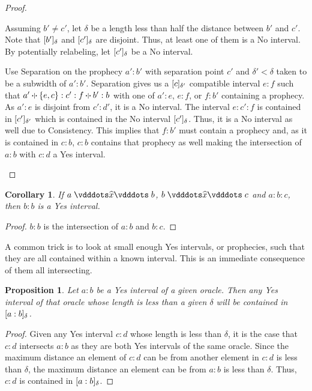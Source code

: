 \documentclass[12pt]{article}
\newtheorem{corollary}{Corollary}[section]
\newtheorem{proposition}{Proposition}[section]
\begin{document}
\begin{proof}
\begin{enumerate}
        Assuming $b' \neq c'$, let $\delta$ be a length less than half the distance between $b'$ and $c'$. Note that $\halo{b'}$ and $\halo{c'}$ are disjoint. Thus, at least one of them is a No interval. By potentially relabeling, let $\halo{c'}$ be a No interval. 

        Use Separation on the prophecy $a':b'$ with separation point $c'$ and $\delta' < \delta$ taken to be a subwidth of $a':b'$. Separation gives us a $\halo[\delta']{c}$ compatible interval $e:f$ such that $a'\betneq \{e,c\}:c':f \betneq b':b$  with one of $a':e$, $e:f$, or $f:b'$ containing a prophecy. As $a':e$ is disjoint from $c':d'$, it is a No interval. The interval $e:c':f$ is contained in $\halo[\delta']{c'}$ which is contained in the No interval $\halo{c'}$. Thus, it is a No interval as well due to Consistency. This implies that $f:b'$ must contain a prophecy and, as it is contained in $c:b$, $c:b$ contains that prophecy as well making the intersection of $a:b$ with $c:d$ a Yes interval.  
     \end{enumerate}
\end{proof}

\begin{corollary}
    If $a \xora b$, $b \xora c$ and $a:b:c$, then $b:b$ is a Yes interval.
\end{corollary}

\begin{proof}
    $b:b$ is the intersection of $a:b$ and $b:c$.
\end{proof}

A common trick is to look at small enough Yes intervals, or prophecies, such that they are all contained within a known interval. This is an immediate consequence of them all intersecting. 

\begin{proposition}\label{os:yescontain}
    Let $a:b$ be a Yes interval of a given oracle. Then any Yes interval of that oracle whose length is less than a given $\delta$ will be contained in $\halo{a:b}$.
\end{proposition}

\begin{proof}
    Given any Yes interval $c:d$ whose length is less than $\delta$, it is the case that $c:d$ intersects $a:b$ as they are both Yes intervals of the same oracle. Since the maximum distance an element of $c:d$ can be from another element in $c:d$ is less than $\delta$, the maximum distance an element can be from $a:b$ is less than $\delta$. Thus, $c:d$ is contained in $\halo{a:b}$.
\end{proof}
\end{document}
